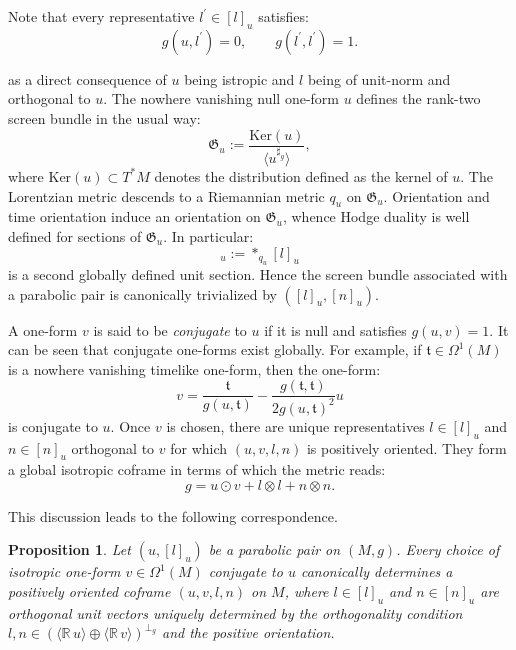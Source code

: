 \documentclass[10pt,reqno,a4paper]{amsart}
\theoremstyle{plain}
\newtheorem{prop}[thm]{Proposition}
\theoremstyle{definition}
\theoremstyle{remark}
\theoremstyle{remark}
\newcommand{\frt}{\mathfrak{t}}
\newcommand{\frG}{\mathfrak{G}}
\renewcommand{\(}{ (}
\renewcommand{\)}{ )}
\begin{document}
\noindent
Note that every representative $l^{\prime}\in [l]_u$ satisfies:
\begin{equation*} 
g(u,l^{\prime})=0,\qquad g(l^{\prime},l^{\prime})=1.
\end{equation*}

\noindent
as a direct consequence of $u$ being istropic and $l$ being of unit-norm and orthogonal to $u$. The nowhere vanishing null one-form $u$ defines the rank-two screen bundle in the usual way:
\begin{equation*} 
\frG_u:= \frac{\mathrm{Ker}(u)}{\langle u^{\sharp_g}\rangle},
\end{equation*}
where $\mathrm{Ker}(u)\subset T^*M$ denotes the distribution defined as the kernel of $u$.  The Lorentzian metric descends to a Riemannian metric $q_u$ on $\frG_u$.  Orientation and time orientation induce an orientation on $\frG_u$, whence Hodge duality is well defined for sections of $\frG_u$. In particular:
\begin{equation*}
[n]_u:=\ast_{q_u}[l]_u
\end{equation*}
is a second globally defined unit section. Hence the screen bundle associated with a parabolic pair is canonically trivialized by $([l]_u,[n]_u)$.\medskip

\noindent
A one-form $v$ is said to be \emph{conjugate} to $u$ if it is null and satisfies $g(u,v)=1$.  It can be seen that conjugate one-forms exist globally.  For example, if $\frt \in \Omega^1(M)$ is a nowhere vanishing timelike one-form, then the one-form:
\begin{equation*}
v=\frac{\frt}{g(u,\frt)}-\frac{g(\frt,\frt)}{2g(u,\frt)^2}u
\end{equation*}
is conjugate to $u$.  Once $v$ is chosen, there are unique representatives $l\in[l]_u$ and $n\in[n]_u$ orthogonal to $v$ for which $(u,v,l,n)$ is positively oriented.  They form a global isotropic coframe in terms of which the metric reads:
\begin{equation}
\label{eq:metricfromisotropiccoframe}
g=u\odot v+l\otimes l+n\otimes n.
\end{equation}

\noindent
This discussion leads to the following correspondence.

\begin{prop}
Let $(u,[l]_u)$ be a parabolic pair on $(M,g)$. Every choice of isotropic one-form $v\in \Omega^1(M)$ conjugate to $u$ canonically determines a positively oriented coframe $(u,v,l,n)$ on $M$, where $l\in [l]_u$ and $n\in [n]_u$ are orthogonal unit vectors uniquely determined by the orthogonality condition $l,n\in ( \langle \mathbb{R}\, u\rangle  \oplus \langle \mathbb{R}\, v \rangle)^{\perp_g}$ and the positive orientation.
\end{prop}
\end{document}
